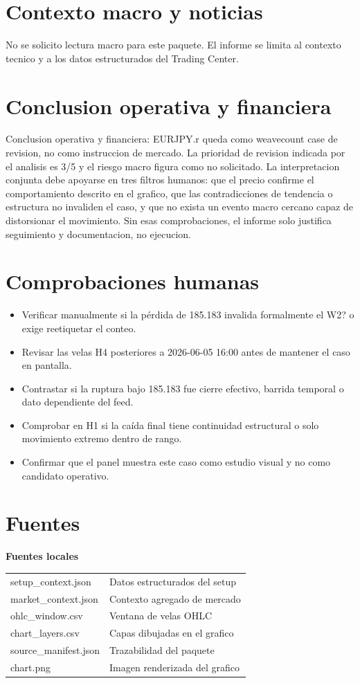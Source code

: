 \documentclass[11pt,a4paper]{article}
\begin{document}
\section*{Contexto macro y noticias}
No se solicito lectura macro para este paquete. El informe se limita al contexto tecnico y a los datos estructurados del Trading Center.

\section*{Conclusion operativa y financiera}
Conclusion operativa y financiera: EURJPY.r queda como weavecount case de revision, no como instruccion de mercado. La prioridad de revision indicada por el analisis es 3/5 y el riesgo macro figura como no solicitado. La interpretacion conjunta debe apoyarse en tres filtros humanos: que el precio confirme el comportamiento descrito en el grafico, que las contradicciones de tendencia o estructura no invaliden el caso, y que no exista un evento macro cercano capaz de distorsionar el movimiento. Sin esas comprobaciones, el informe solo justifica seguimiento y documentacion, no ejecucion.

\section*{Comprobaciones humanas}
\begin{itemize}
  \item Verificar manualmente si la pérdida de 185.183 invalida formalmente el W2? o exige reetiquetar el conteo.
  \item Revisar las velas H4 posteriores a 2026-06-05 16:00 antes de mantener el caso en pantalla.
  \item Contrastar si la ruptura bajo 185.183 fue cierre efectivo, barrida temporal o dato dependiente del feed.
  \item Comprobar en H1 si la caída final tiene continuidad estructural o solo movimiento extremo dentro de rango.
  \item Confirmar que el panel muestra este caso como estudio visual y no como candidato operativo.
\end{itemize}

\section*{Fuentes}
\textbf{Fuentes locales}\par
\begin{tabularx}{\textwidth}{p{4.2cm}X}
setup\_context.json & Datos estructurados del setup \\
market\_context.json & Contexto agregado de mercado \\
ohlc\_window.csv & Ventana de velas OHLC \\
chart\_layers.csv & Capas dibujadas en el grafico \\
source\_manifest.json & Trazabilidad del paquete \\
chart.png & Imagen renderizada del grafico \\
\end{tabularx}
\end{document}
